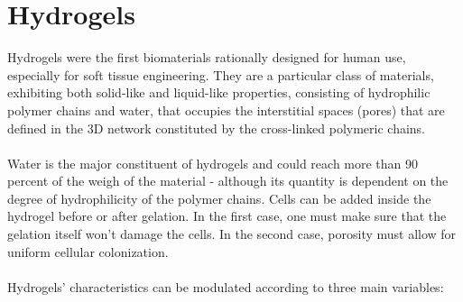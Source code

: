 \graphicspath{{chapters/06/images/}}
\chapter{Hydrogels}
Hydrogels were the first biomaterials rationally designed for human use, especially for soft tissue engineering.
They are a particular class of materials, exhibiting both solid-like and liquid-like properties, consisting of hydrophilic polymer chains and water, that occupies the interstitial spaces (pores) that are defined in the 3D network constituted by the cross-linked polymeric chains.
\\
\\
\noindent
Water is the major constituent of hydrogels and could reach more than 90 percent of the weigh of the material - although its quantity is dependent on the degree of hydrophilicity of the polymer chains.
Cells can be added inside the hydrogel before or after gelation.
In the first case, one must make sure that the gelation itself won’t damage the cells.
In the second case, porosity must allow for uniform cellular colonization.
\\
\\
\noindent
Hydrogels’ characteristics can be modulated according to three main variables:
